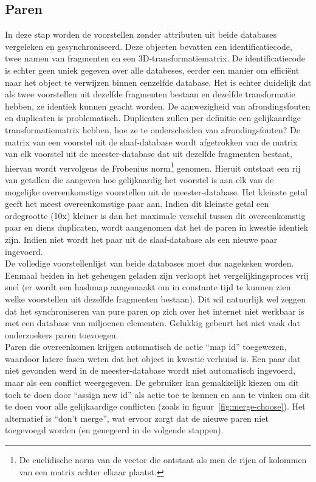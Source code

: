 \subsection{Paren}
In deze stap worden de voorstellen zonder attributen uit beide databases vergeleken en gesynchroniseerd. Deze objecten bevatten een identificatiecode, twee namen van fragmenten en een 3D-transformatiematrix. De identificatiecode is echter geen uniek gegeven over alle databeses, eerder een manier om effici\"ent naar het object te verwijzen binnen eenzelfde database. Het is echter duidelijk dat als twee voorstellen uit dezelfde fragmenten bestaan en dezelfde transformatie hebben, ze identiek kunnen geacht worden. De aanwezigheid van afrondingsfouten en duplicaten is problematisch. Duplicaten zullen per definitie een gelijkaardige transformatiematrix hebben, hoe ze te onderscheiden van afrondingsfouten? De matrix van een voorstel uit de slaaf-database wordt afgetrokken van de matrix van elk voorstel uit de meester-database dat uit dezelfde fragmenten bestaat, hiervan wordt vervolgens de Frobenius norm\footnote{De euclidische norm van de vector die ontstaat als men de rijen of kolommen van een matrix achter elkaar plaatst.} genomen. Hieruit ontstaat een rij van getallen die aangeven hoe gelijkaardig het voorstel is aan elk van de mogelijke overeenkomstige voorstellen uit de meester-database. Het kleinste getal geeft het meest overeenkomstige paar aan. Indien dit kleinste getal een ordegrootte (10x) kleiner is dan het maximale verschil tussen dit overeenkomstig paar en diens duplicaten, wordt aangenomen dat het de paren in kwestie identiek zijn. Indien niet wordt het paar uit de slaaf-database als een nieuwe paar ingevoerd.\\

De volledige voorstellenlijst van beide databases moet dus nagekeken worden. Eenmaal beiden in het geheugen geladen zijn verloopt het vergelijkingsproces vrij snel (er wordt een hashmap aangemaakt om in constante tijd te kunnen zien welke voorstellen uit dezelfde fragmenten bestaan). Dit wil natuurlijk wel zeggen dat het synchroniseren van pure paren op zich over het internet niet werkbaar is met een database van miljoenen elementen. Gelukkig gebeurt het niet vaak dat onderzoekers paren toevoegen.\\

Paren die overeenkomen krijgen automatisch de actie ``map id'' toegewezen, waardoor latere fasen weten dat het object in kwestie verhuisd is. Een paar dat niet gevonden werd in de meester-database wordt niet automatisch ingevoerd, maar als een conflict weergegeven. De gebruiker kan gemakkelijk kiezen om dit toch te doen door ``assign new id'' als actie toe te kennen en aan te vinken om dit te doen voor alle gelijkaardige conflicten (zoals in figuur~\ref{fig:merge-choose}). Het alternatief is ``don't merge'', wat ervoor zorgt dat de nieuwe paren niet toegevoegd worden (en genegeerd in de volgende stappen).

